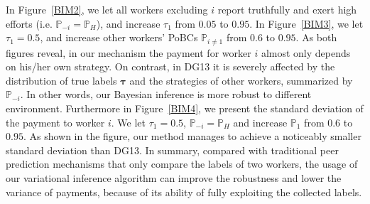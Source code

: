 In Figure~\ref{BIM2}, we let all workers excluding $i$ report truthfully and exert high efforts (i.e. $\mathbb{P}_{-i} = \mathbb{P}_H$), 
and increase $\tau_1$ from $0.05$ to $0.95$.
In Figure~\ref{BIM3}, we let $\tau_1=0.5$, and increase other workers' PoBCs $\mathbb{P}_{i\neq 1}$ from $0.6$ to $0.95$.
As both figures reveal, in our mechanism the payment for worker $i$ almost only depends on his/her own strategy. On contrast, in DG13 it is severely affected by the distribution of true labels $\bm{\tau}$ and the strategies of other workers, summarized by $\mathbb{P}_{-i}$.
In other words, our Bayesian inference is more robust to different environment.
Furthermore in Figure~\ref{BIM4}, we present the standard deviation of the payment to worker $i$.
We let $\tau_1=0.5$, $\mathbb{P}_{-i}=\mathbb{P}_H$ and increase $\mathbb{P}_1$ from $0.6$ to $0.95$.
As shown in the figure, our method manages to achieve a noticeably smaller standard deviation than DG13. 
In summary, compared with traditional peer prediction mechanisms that only compare the labels of two workers, the usage of our variational inference algorithm can improve the robustness and lower the variance of payments, because of its ability of fully exploiting the collected labels. 



